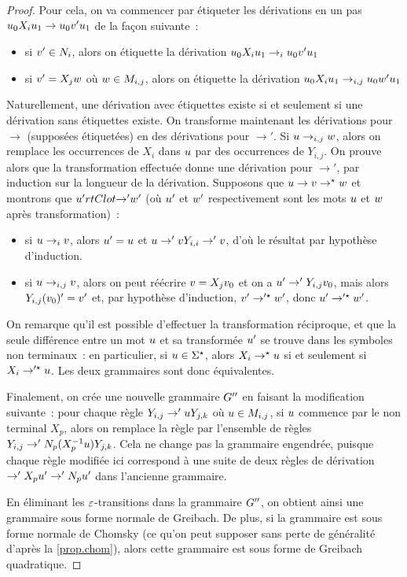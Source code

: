 \begin{proof}
  Pour cela, on va commencer par étiqueter les dérivations en un pas
  $u_0 X_i u_1 \to u_0 v' u_1$ de la façon suivante~:
  \begin{itemize}
  \item si $v' \in N_i$, alors on étiquette la dérivation
    $u_0 X_i u_1 \to_i u_0 v' u_1$
  \item si $v' = X_j w$ où $w \in M_{i,j}$, alors on étiquette la
    dérivation $u_0 X_i u_1 \to_{i,j} u_0 w' u_1$
  \end{itemize}
  Naturellement, une dérivation avec étiquettes existe si et seulement si une
  dérivation sans étiquettes existe.
  On transforme maintenant les dérivations pour $\to$ (supposées étiquetées) en
  des dérivations pour $\to'$. Si $u \to_{i,j} w$, alors on remplace
  les occurrences de $X_i$ dans $u$ par des occurrences de $Y_{i,j}$. On
  prouve alors que la transformation effectuée donne une dérivation pour $\to'$,
  par induction sur la longueur de la dérivation. Supposons que
  $u \to v \to^{\mathord{\star}}w$ et montrons que
  $u' rtClot{\to'} w'$ (où $u'$ et $w'$ respectivement sont
  les mots $u$ et $w$ après transformation)~:
  \begin{itemize}
  \item si $u \to_i v$, alors $u' = u$ et
    $u \to' v Y_{i,i} \to' v$, d'où le résultat par hypothèse
    d'induction.
  \item si $u \to_{i,j} v$, alors on peut réécrire
    $v = X_j v_0$ et on a $u' \to' Y_{i,j} v_0$, mais alors
    $Y_{i,j} (v_0)' = v'$ et, par hypothèse d'induction,
    $v' \to'^{\mathord{\star}} w'$, donc $u' \to'^{\mathord{\star}}w'$.
  \end{itemize}
  On remarque qu'il est possible d'effectuer la transformation réciproque, et
  que la seule différence entre un mot $u$ et sa transformée $u'$ se
  trouve dans les symboles non terminaux~: en particulier, si $u\in\Sigma^{\star}$,
  alors $X_i \to^{\mathord{\star}} u$ si et seulement si $X_i \to'^{\mathord{\star}}u$.
  Les deux grammaires sont donc équivalentes.

  Finalement, on crée une nouvelle grammaire $G''$ en faisant la
  modification suivante~: pour chaque règle $Y_{i,j} \to' u Y_{j,k}$ où
  $u \in M_{i,j}$, si $u$ commence par le non terminal $X_p$, alors on
  remplace la règle par l'ensemble de règles
  $Y_{i,j} \to' N_p(X_p^{-1}u)Y_{j,k}$. Cela ne change pas la grammaire
  engendrée, puisque chaque règle modifiée ici correspond à une suite de deux
  règles de dérivation $\to' X_pu' \to' N_pu'$ dans l'ancienne
  grammaire.

  En éliminant les $\varepsilon$-transitions dans la grammaire $G''$, on obtient
  ainsi une grammaire sous forme normale de Greibach. De plus, si la grammaire
  est sous forme normale de Chomsky (ce qu'on peut supposer sans perte de
  généralité d'après la
  \cref{prop.chom}), alors cette grammaire est sous forme de Greibach
  quadratique.
\end{proof}

